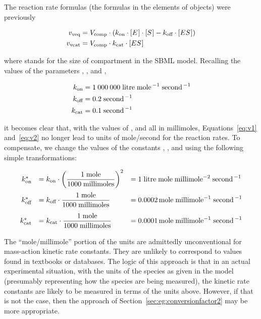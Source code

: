 The reaction rate formulas (\ie the formulas in the 
elements of \KineticLaw objects) were previously
\begin{linenomath}
  \begin{align}
    \label{eq:v1}
    v_\text{veq}  & = V_\text{comp} \cdot (k_\text{on} \cdot [E\mkern1mu] \cdot [S\mkern1mu] - k_\text{off} \cdot [ES\mkern1mu])\\
    \label{eq:v2}
    v_\text{vcat} & = V_\text{comp} \cdot k_\text{cat} \cdot [ES\mkern1mu]
  \end{align}
\end{linenomath}
where \Vcomp stands for the size of compartment  in the
SBML model.  Recalling the values of the parameters \kon, \koff,
and \kcat,
\begin{linenomath}
  \begin{align*}
    k_\text{on}         &= 1\:000\:000 \; \text{litre} \; \text{mole}^{\,-1} \; \text{second}^{\,-1}\\
    k_\text{off}        &= 0.2 \; \text{second}^{\,-1}\\
    k_\text{cat}        &= 0.1 \; \text{second}^{\,-1}
  \end{align*}
\end{linenomath}
it becomes clear that, with the values of , 
and  all in \unit{millimoles}, Equations~\ref{eq:v1}
and~\ref{eq:v2} no longer lead to units of
\unit{mole}/\unit{second} for the reaction rates.  To compensate,
we change the values of the constants \kon, \koff, and \kcat using
the following simple transformations:
\begin{linenomath}
  \begin{equation*}
    \begin{array}{rll}
      k_\text{on}^{*} &= k_\text{on} \cdot \left( \dfrac{1 \; \text{mole}}{1000 \; \text{millimoles}} \right)^{2}
      &= 1 \; \text{litre} \; \text{mole} \; \text{millimole}^{-2} \; \text{second}^{\,-1} \\[12pt]
      k_\text{off}^{*} &= k_\text{off} \cdot \dfrac{1 \; \text{mole}}{1000 \; \text{millimoles}}
      &= 0.0002 \, \text{mole} \; \text{millimole}^{-1} \; \text{second}^{\,-1} \\[12pt]
      k_\text{cat}^{*} &= k_\text{cat} \cdot \dfrac{1 \; \text{mole}}{1000 \; \text{millimoles}}
      &= 0.0001 \, \text{mole} \; \text{millimole}^{-1} \; \text{second}^{\,-1} \\[5pt]
    \end{array}
  \end{equation*}
\end{linenomath}
The ``\unit{mole}/\unit{millimole}'' portion of the units are
admittedly unconventional for mass-action kinetic rate constants.
They are unlikely to correspond to values found in textbooks or
databases.  The logic of this approach is that in an actual
experimental situation, with the units of the species as given in
the model (presumably representing how the species are being
measured), the kinetic rate constants are likely to be measured in
terms of the units above.  However, if that is not the case, then
the approach of Section~\ref{sec:eg:conversionfactor2} may be more
appropriate.


